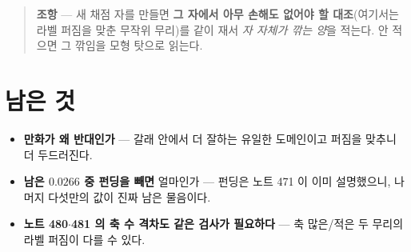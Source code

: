 \documentclass[11pt]{article}
\begin{document}
\begin{quote}
\textbf{조항} --- 새 채점 자를 만들면 \textbf{그 자에서 아무 손해도
없어야 할 대조}(여기서는 라벨 퍼짐을 맞춘 무작위 무리)를 같이 재서
\emph{자 자체가 깎는 양}을 적는다. 안 적으면 그 깎임을 모형 탓으로
읽는다.
\end{quote}

\section*{남은 것}

\begin{itemize}
\item \textbf{만화가 왜 반대인가} --- 갈래 안에서 더 잘하는 유일한
도메인이고 퍼짐을 맞추니 더 두드러진다.
\item \textbf{남은 $0.0266$ 중 펀딩을 빼면} 얼마인가 --- 펀딩은 노트 471
이 이미 설명했으니, 나머지 다섯만의 값이 진짜 남은 물음이다.
\item \textbf{노트 480$\cdot$481 의 축 수 격차도 같은 검사가 필요하다}
--- 축 많은/적은 두 무리의 라벨 퍼짐이 다를 수 있다.
\end{itemize}
\end{document}
